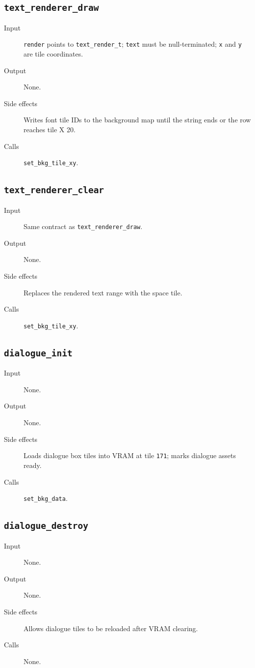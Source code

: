 \subsection*{\texttt{text\_renderer\_draw}}
\begin{description}
  \item[Input] \texttt{render} points to \texttt{text\_render\_t}; \texttt{text} must be null-terminated; \texttt{x} and \texttt{y} are tile coordinates.
  \item[Output] None.
  \item[Side effects] Writes font tile IDs to the background map until the string ends or the row reaches tile X 20.
  \item[Calls] \texttt{set\_bkg\_tile\_xy}.
\end{description}

\subsection*{\texttt{text\_renderer\_clear}}
\begin{description}
  \item[Input] Same contract as \texttt{text\_renderer\_draw}.
  \item[Output] None.
  \item[Side effects] Replaces the rendered text range with the space tile.
  \item[Calls] \texttt{set\_bkg\_tile\_xy}.
\end{description}

\subsection*{\texttt{dialogue\_init}}
\begin{description}
  \item[Input] None.
  \item[Output] None.
  \item[Side effects] Loads dialogue box tiles into VRAM at tile \texttt{171}; marks dialogue assets ready.
  \item[Calls] \texttt{set\_bkg\_data}.
\end{description}

\subsection*{\texttt{dialogue\_destroy}}
\begin{description}
  \item[Input] None.
  \item[Output] None.
  \item[Side effects] Allows dialogue tiles to be reloaded after VRAM clearing.
  \item[Calls] None.
\end{description}

